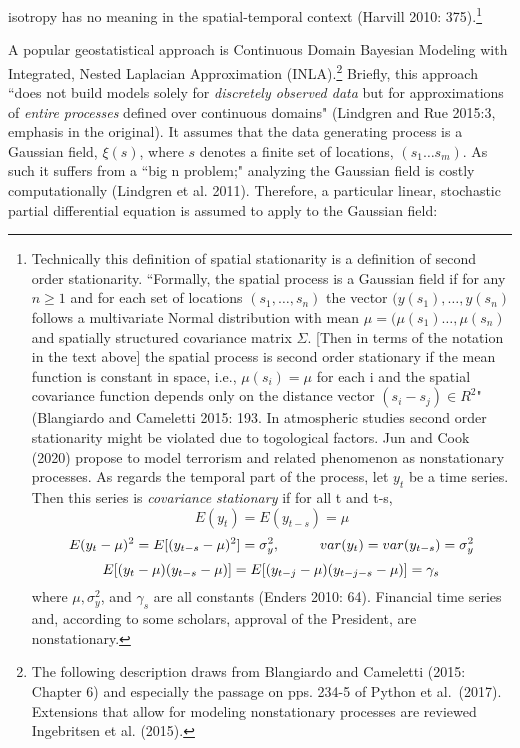 \documentclass[12pt]{article}
\begin{document}
isotropy has no meaning in the spatial-temporal context (Harvill 2010: 375).\footnote{Technically
this definition of spatial stationarity is a definition of second order stationarity.
``Formally, the spatial process is
a Gaussian field if for any $n \geq 1$ and for each set of locations $(s_1, \ldots, s_n)$ the
vector $(y(s_1), \dots, y(s_n)$ follows a multivariate Normal distribution with mean
$\mu = (\mu(s_1) \ldots, \mu(s_n)$  and spatially structured covariance matrix $\Sigma$.
[Then in terms of the notation in the text above] the spatial process is second order
stationary if the mean function is constant in space, i.e., $\mu(s_i) = \mu$ for each i and
the spatial covariance function depends only on the distance vector $(s_i- s_j) \in R^2$"
(Blangiardo and Cameletti 2015: 193. In atmospheric
studies second order stationarity might be violated due to togological factors. Jun and
Cook (2020) propose to model
terrorism and related phenomenon as nonstationary processes. As regards the temporal
part of the process, let $y_t$ be a time series. Then this series is \textit{covariance
stationary} if for all t and t-s,
\begin{equation}
E(y_t) = E(y_{t-s}) = \mu
\end{equation}
\begin{equation}
E(y_t - \mu)^2 = E[(y_{t-s} - \mu)^2] = \sigma_{y}^2 \\, \hspace{1cm} var(y_t) = var (y_{t-s}) = \sigma_{y}^2
\end{equation}
\begin{equation}
E[(y_t - \mu)(y_{t-s} - \mu)] = E[(y_{t-j} - \mu)(y_{t-j-s} - \mu)] = \gamma_s \\
\end{equation}
where $\mu, \sigma_{y}^2$, and  $\gamma_s$ are all constants (Enders 2010: 64). Financial
time series and, according to some scholars, approval of the President, are
nonstationary.}


A popular geostatistical approach is Continuous
Domain Bayesian Modeling with Integrated, Nested Laplacian Approximation
(INLA).\footnote{The following description draws from Blangiardo and Cameletti (2015: Chapter 6)
and especially the passage on pps. 234-5 of Python et al.\ (2017). Extensions that allow for
modeling nonstationary processes are
reviewed Ingebritsen  et al. (2015). } Briefly, this approach ``does not build models solely
for \emph{discretely observed data} but for approximations of \emph{entire processes} defined
over continuous domains" (Lindgren and Rue 2015:3, emphasis in the original). It assumes that
 the data generating process is a Gaussian field, $\xi(s)$, where $s$ denotes a finite set of
 locations, $(s_1 \ldots s_m)$. As such it suffers from a ``big n problem;" analyzing the
 Gaussian field is costly computationally (Lindgren et al. 2011). Therefore, a particular
 linear, stochastic partial differential equation is assumed to apply to the Gaussian field:
\end{document}
